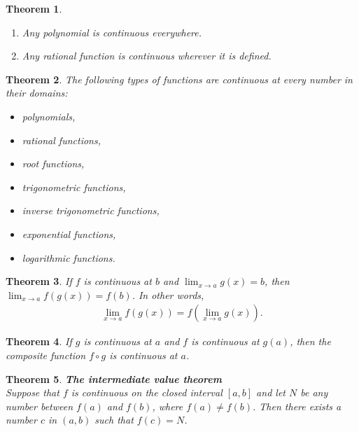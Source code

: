 \documentclass{article}
\theoremstyle{sltheorem}
\newtheorem{theorem}{Theorem}[section]
\begin{document}
\begin{theorem}
    \begin{enumerate}
        \item Any polynomial is continuous everywhere.
        \item Any rational function is continuous wherever it is defined.
    \end{enumerate}
\end{theorem}
\begin{theorem}
    The following types of functions are continuous at every number in their domains:
    \begin{itemize}
        \item polynomials,
        \item rational functions,
        \item root functions,
        \item trigonometric functions,
        \item inverse trigonometric functions,
        \item exponential functions,
        \item logarithmic functions.
    \end{itemize}
\end{theorem}
\begin{theorem}
    If $f$ is continuous at $b$ and $\lim_{x\to a}g(x) = b$, then $\lim_{x\to a}f(g(x))=f(b)$. In other words,
    \begin{align*}
        \lim_{x\to a}f(g(x))=f\left(\lim_{x\to a}g(x)\right).
    \end{align*}
\end{theorem}
\begin{theorem}
    If $g$ is continuous at $a$ and $f$ is continuous at $g(a)$, then the composite function $f\circ g$ is continuous at $a$.
\end{theorem}
\begin{theorem}
    \textbf{The intermediate value theorem}\\
    Suppose that $f$ is continuous on the closed interval $[a,b]$ and let $N$ be any number between $f(a)$ and $f(b)$, where $f(a)\not=f(b)$. Then there exists a number $c$ in $(a,b)$ such that $f(c)=N$.
\end{theorem}
\end{document}
